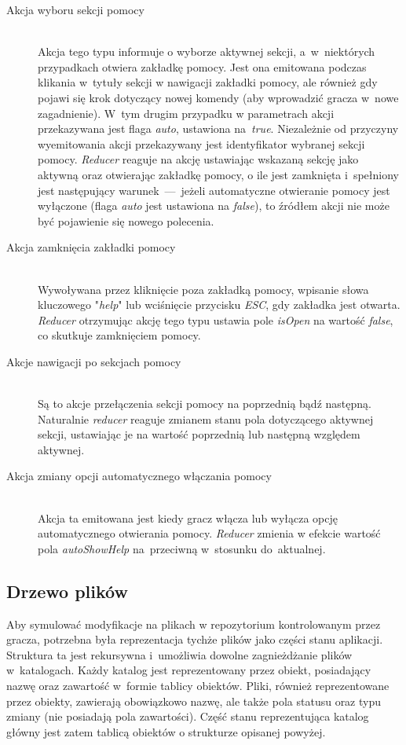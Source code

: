\documentclass[12pt,a4paper,polish,thesis]{dcsbook}
\begin{document}
{\begin{description}
	\item[Akcja wyboru sekcji pomocy] \hfill \\
	Akcja tego typu informuje o wyborze aktywnej sekcji, a~w~niektórych przypadkach otwiera zakładkę pomocy. Jest ona emitowana podczas klikania w~tytuły sekcji w nawigacji zakładki pomocy, ale również gdy pojawi się krok dotyczący nowej komendy (aby wprowadzić gracza w~nowe zagadnienie). W~tym drugim przypadku w parametrach akcji przekazywana jest flaga \textit{auto}, ustawiona na~\textit{true}. Niezależnie od przyczyny wyemitowania akcji przekazywany jest identyfikator wybranej sekcji pomocy. \textit{Reducer} reaguje na akcję ustawiając wskazaną sekcję jako aktywną oraz otwierając zakładkę pomocy, o ile jest zamknięta i~spełniony jest następujący warunek~---~jeżeli automatyczne otwieranie pomocy jest wyłączone (flaga \textit{auto} jest ustawiona na \textit{false}), to źródłem akcji nie może być pojawienie się nowego polecenia.
	
	\item[Akcja zamknięcia zakładki pomocy] \hfill \\
	Wywoływana przez kliknięcie poza zakładką pomocy, wpisanie słowa kluczowego "\textit{help}" lub wciśnięcie przycisku \textit{ESC}, gdy zakładka jest otwarta. \textit{Reducer} otrzymując akcję tego typu ustawia pole \textit{isOpen} na wartość \textit{false}, co skutkuje zamknięciem pomocy.
	
	\item[Akcje nawigacji po sekcjach pomocy] \hfill \\
	Są to akcje przełączenia sekcji pomocy na poprzednią bądź następną. Naturalnie \textit{reducer} reaguje zmianem stanu pola dotyczącego aktywnej sekcji, ustawiając je na wartość poprzednią lub następną względem aktywnej.
	
	\item[Akcja zmiany opcji automatycznego włączania pomocy] \hfill \\
	Akcja ta emitowana jest kiedy gracz włącza lub wyłącza opcję automatycznego otwierania pomocy. \textit{Reducer} zmienia w efekcie wartość pola \textit{autoShowHelp} na~przeciwną w~stosunku do~aktualnej.
	\end{description}
	
	\subsection{Drzewo plików} \label{DrzewoStan}
	
	Aby symulować modyfikacje na plikach w repozytorium kontrolowanym przez gracza, potrzebna była reprezentacja tychże plików jako części stanu aplikacji. Struktura ta jest rekursywna i~umożliwia dowolne zagnieżdżanie plików w~katalogach. Każdy katalog jest reprezentowany przez obiekt, posiadający nazwę oraz zawartość w~formie tablicy obiektów. Pliki, również reprezentowane przez obiekty, zawierają obowiązkowo nazwę, ale także pola statusu oraz typu zmiany (nie posiadają pola zawartości). Część stanu reprezentująca katalog główny jest zatem tablicą obiektów o strukturze opisanej powyżej.
	
}
\end{document}
